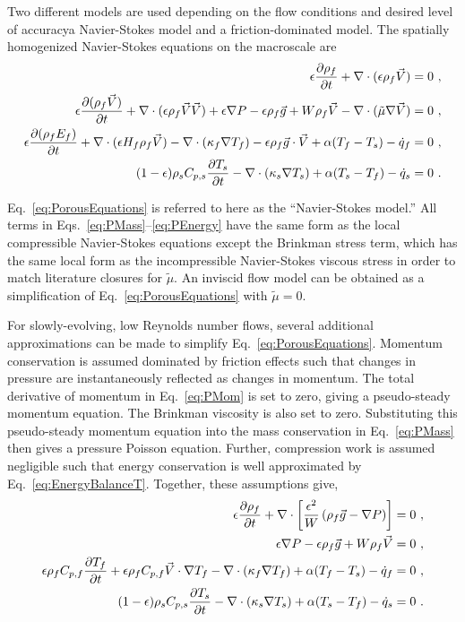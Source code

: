 Two different models are used depending on the flow conditions and desired level of accuracy\mdash a Navier-Stokes model and a friction-dominated model. The spatially homogenized Navier-Stokes equations on the macroscale are
\begin{subequations}
\label{eq:PorousEquations}
\begin{align}
\label{eq:PMass}\epsilon\frac{\partial\rho_f}{\partial t} + \nabla\cdot(\epsilon\rho_f\vec{V})=0\ ,\\
\label{eq:PMom}\epsilon\frac{\partial(\rho_f\vec{V})}{\partial t}+\nabla\cdot(\epsilon\rho_f\vec{V}\vec{V})+\epsilon\nabla P-\epsilon\rho_f\vec{g}+W\rho_f\vec{V}-\nabla\cdot(\tilde{\mu}\nabla\vec{V})=0\ ,\\
\label{eq:PEnergy}\epsilon\frac{\partial (\rho_f E_f)}{\partial t}+\nabla\cdot(\epsilon H_f\rho_f\vec{V})-\nabla\cdot(\kappa_f\nabla T_f)-\epsilon\rho_f \vec{g}\cdot\vec{V}+\alpha(T_f-T_s)-\dot{q}_f=0\ ,\\
\label{eq:PSEnergy}(1-\epsilon)\rho_sC_{p,s}\frac{\partial T_s}{\partial t}-\nabla\cdot(\kappa_s\nabla T_s)+\alpha(T_s-T_f)-\dot{q}_s=0\ .
\end{align}
\end{subequations}

\noindent Eq.\ \eqref{eq:PorousEquations} is referred to here as the ``Navier-Stokes model.'' All terms in Eqs.\ \eqref{eq:PMass}--\eqref{eq:PEnergy} have the same form as the local compressible Navier-Stokes equations except the Brinkman stress term, which has the same local form as the incompressible Navier-Stokes viscous stress in order to match literature closures for \(\tilde{\mu}\). An inviscid flow model can be obtained as a simplification of Eq.\ \eqref{eq:PorousEquations} with \(\tilde{\mu}=0\).

For slowly-evolving, low Reynolds number flows, several additional approximations can be made to simplify Eq.\ \eqref{eq:PorousEquations}. Momentum conservation is assumed dominated by friction effects such that changes in pressure are instantaneously reflected as changes in momentum. The total derivative of momentum in Eq.\ \eqref{eq:PMom} is set to zero, giving a pseudo-steady momentum equation. The Brinkman viscosity is also set to zero. Substituting this pseudo-steady momentum equation into the mass conservation in Eq.\ \eqref{eq:PMass} then gives a pressure Poisson equation. Further, compression work is assumed negligible such that energy conservation is well approximated by Eq.\ \eqref{eq:EnergyBalanceT}. Together, these assumptions give,
\begin{subequations}
\label{eq:PrimitiveEqns}
\begin{align}
\label{eq:PMass2}
\epsilon\frac{\partial\rho_f}{\partial t}+\nabla\cdot\left\lbrack\frac{\epsilon^2}{W}\left(\rho_f\vec{g}-\nabla P\right)\right\rbrack=0\ ,\\
\label{eq:PMom2}
\epsilon\nabla P-\epsilon\rho_f\vec{g}+W\rho_f\vec{V}=0\ ,\\
\label{eq:PEnergy2}
\epsilon\rho_fC_{p,f}\frac{\partial T_f}{\partial t}+\epsilon\rho_fC_{p,f}\vec{V}\cdot\nabla T_f-\nabla\cdot(\kappa_f\nabla T_f)+\alpha(T_f-T_s)-\dot{q}_f=0\ ,\\
\label{eq:PSEnergy2}
(1-\epsilon)\rho_sC_{p,s}\frac{\partial T_s}{\partial t}-\nabla\cdot(\kappa_s\nabla T_s)+\alpha(T_s-T_f)-\dot{q}_s=0\ .
\end{align}
\end{subequations}

